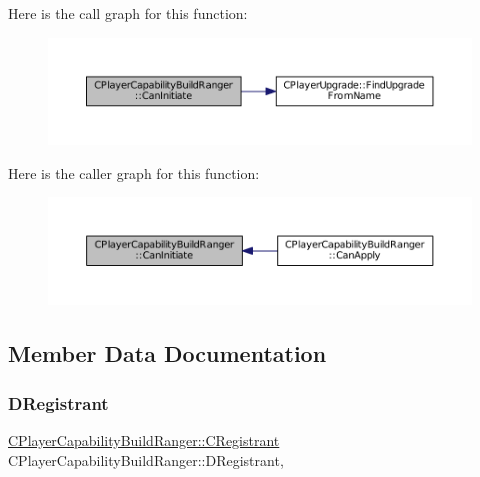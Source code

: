 Here is the call graph for this function\+:
\nopagebreak
\begin{figure}[H]
\begin{center}
\leavevmode
\includegraphics[width=350pt]{classCPlayerCapabilityBuildRanger_ad8b45a3ffc7ee82d5550cc690823d82c_cgraph}
\end{center}
\end{figure}
Here is the caller graph for this function\+:
\nopagebreak
\begin{figure}[H]
\begin{center}
\leavevmode
\includegraphics[width=350pt]{classCPlayerCapabilityBuildRanger_ad8b45a3ffc7ee82d5550cc690823d82c_icgraph}
\end{center}
\end{figure}


\subsection{Member Data Documentation}
\hypertarget{classCPlayerCapabilityBuildRanger_a612ac35d629ed8c0ef38d52d26aee222}{}\label{classCPlayerCapabilityBuildRanger_a612ac35d629ed8c0ef38d52d26aee222} 
\subsubsection{\texorpdfstring{D\+Registrant}{DRegistrant}}
{\footnotesize\ttfamily \hyperlink{classCPlayerCapabilityBuildRanger_1_1CRegistrant}{C\+Player\+Capability\+Build\+Ranger\+::\+C\+Registrant} C\+Player\+Capability\+Build\+Ranger\+::\+D\+Registrant\hspace{0.3cm}{\ttfamily [static]}, {\ttfamily [protected]}}



